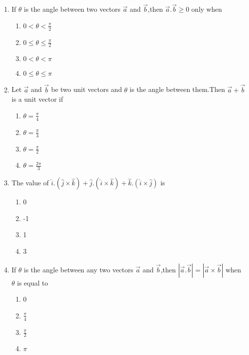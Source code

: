 \begin{enumerate}[label=\thesection.\arabic*,ref=\thesection.\theenumi]
\item If $\theta$ is the angle between two vectors $\vec{a}$ and $\vec{b}$,then $\vec{a}.\vec{b}\geq0$ only when 
\begin{enumerate}
\item $0<\theta<\frac{\pi}{2}$
\item $0\leq\theta\leq\frac{\pi}{2}$
\item $0<\theta<\pi$
\item $0\leq\theta\leq\pi$
\end{enumerate}
\item Let $\vec{a}$ and $\vec{b}$ be two unit vectors and $\theta$ is the angle between them.Then $\vec{a}+\vec{b}$ is a unit vector if
\begin{enumerate}
\item $\theta=\frac{\pi}{4}$
\item $\theta=\frac{\pi}{3}$
\item $\theta=\frac{\pi}{2}$
\item $\theta=\frac{2\pi}{3}$
\end{enumerate}
\item The value of $\hat{i}.(\hat{j}\times\hat{k})+\hat{j}.(\hat{i}\times\hat{k})+\hat{k}.(\hat{i}\times\hat{j})$ is
\begin{enumerate}
\item 0
\item -1
\item 1
\item 3
\end{enumerate}
\item If $\theta$ is the angle between any two vectors $\vec{a}$ and $\vec{b}$,then $|\vec{a}.\vec{b}|=|\vec{a}\times\vec{b}|$ when $\theta$ is equal to
\begin{enumerate}
\item 0
\item $\frac{\pi}{4}$
\item $\frac{\pi}{2}$
\item $\pi$
\end{enumerate}

\end{enumerate}


